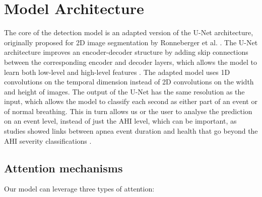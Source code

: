 \section{Model Architecture}

The core of the detection model is an adapted version of the U-Net architecture, originally proposed for 2D image segmentation by Ronneberger et al. \cite{ronneberger2015u}. The U-Net architecture improves an encoder-decoder structure by adding skip connections between the corresponding encoder and decoder layers, which allows the model to learn both low-level and high-level features . The adapted model uses 1D convolutions on the temporal dimension instead of 2D convolutions on the width and height of images. The output of the U-Net has the same resolution as the input, which allows the model to classify each second as either part of an event or of normal breathing. This in turn allows us or the user to analyse the prediction on an event level, instead of just the AHI level, which can be important, as studies showed links between apnea event duration and health that go beyond the AHI severity classifications \cite{butler2019apnea}.

\subsection*{Attention mechanisms}

Our model can leverage three types of attention:

